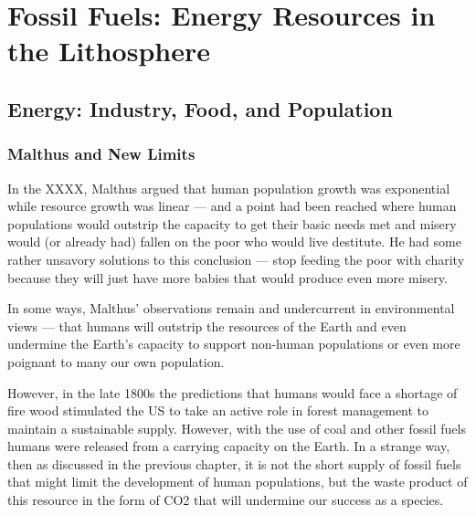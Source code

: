\chapter{Fossil Fuels: Energy Resources in the Lithosphere}\label{ch:ores}

\section{Energy: Industry, Food, and Population}

\subsection{Malthus and New Limits}

In the XXXX, Malthus argued that human population growth was exponential while resource growth was linear --- and a point had been reached where human populations would outstrip the capacity to get their basic needs met and misery would (or already had) fallen on the poor who would live destitute. He had some rather unsavory solutions to this conclusion --- stop feeding the poor with charity because they will just have more babies that would produce even more misery. 

In some ways, Malthus' observations remain and undercurrent in environmental views --- that humans will outstrip the resources of the Earth and even undermine the Earth's capacity to support non-human populations or even more poignant to many our own population.


However, in the late 1800s the predictions that humans would face a shortage of fire wood stimulated the US to take an active role in forest management to maintain a sustainable supply. However, with the use of coal and other fossil fuels humans were released from a carrying capacity on the Earth. In a strange way, then as discussed in the previous chapter, it is not the short supply of \gls{fossil fuels} that might limit the development of human populations, but the waste product of this resource in the form of CO2 that will undermine our success as a species. 

